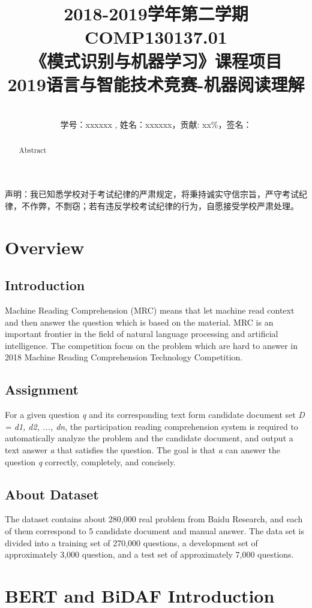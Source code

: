 \documentclass{article}
\title{2018-2019学年第二学期COMP130137.01\\
《模式识别与机器学习》课程项目\\
2019语言与智能技术竞赛-机器阅读理解}
\author{\\
学号：xxxxxx , 姓名：xxxxxx，贡献: xx\%，签名：}
\begin{document}
\begin{center}
  声明：我已知悉学校对于考试纪律的严肃规定，将秉持诚实守信宗旨，严守考试纪律，不作弊，不剽窃；若有违反学校考试纪律的行为，自愿接受学校严肃处理。
\end{center}
\maketitle

\begin{abstract}
   Abstract
\end{abstract}

\section{Overview}
\subsection{Introduction}
Machine Reading Comprehension (MRC) means that let machine read context and then answer the question which is based on the material. MRC is an important frontier in the field of natural language processing and artificial intelligence. The competition focus on the problem which are hard to answer in 2018 Machine Reading Comprehension Technology Competition.
\subsection{Assignment}
For a given question \emph{q} and its corresponding text form candidate document set \emph{D = d1, d2, ..., dn}, the participation reading comprehension system is required to automatically analyze the problem and the candidate document, and output a text answer \emph{a} that satisfies the question. The goal is that \emph{a} can answer the question \emph{q} correctly, completely, and concisely.
\subsection{About Dataset}
The dataset contains about 280,000 real problem from Baidu Research, and each of them correspond to 5 candidate document and manual answer. The data set is divided into a training set of 270,000 questions, a development set of approximately 3,000 question, and a test set of approximately 7,000 questions.

\section{BERT and BiDAF Introduction}
\end{document}
